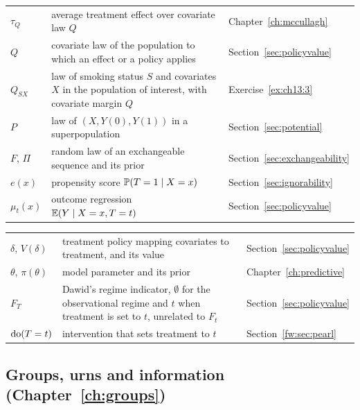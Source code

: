 {\noindent\small\centering
\setlength{\tabcolsep}{4pt}\renewcommand{\arraystretch}{1.1}
\begin{tabular}{>{\raggedright\arraybackslash}p{1.0in}>{\raggedright\arraybackslash}p{2.15in}>{\raggedright\arraybackslash}p{0.95in}}
$\tau_Q$ & average treatment effect over covariate law $Q$ & Chapter~\ref{ch:mccullagh} \\
$Q$ & covariate law of the population to which an effect or a policy applies & Section~\ref{sec:policyvalue} \\
$Q_{SX}$ & law of smoking status $S$ and covariates $X$ in the population of interest, with covariate margin $Q$ & Exercise~\ref{ex:ch13:3} \\
$P$ & law of $(X, Y(0), Y(1))$ in a superpopulation & Section~\ref{sec:potential} \\
$F$, $\Pi$ & random law of an exchangeable sequence and its prior & Section~\ref{sec:exchangeability} \\
$e(x)$ & propensity score $\mathbb{P}(T = 1 \mid X = x)$ & Section~\ref{sec:ignorability} \\
$\mu_t(x)$ & outcome regression $\mathbb{E}(Y \mid X = x, T = t)$ & Section~\ref{sec:policyvalue} \\
\end{tabular}\par}

{\noindent\small\centering
\setlength{\tabcolsep}{4pt}\renewcommand{\arraystretch}{1.1}
\begin{tabular}{>{\raggedright\arraybackslash}p{1.0in}>{\raggedright\arraybackslash}p{2.15in}>{\raggedright\arraybackslash}p{0.95in}}
$\delta$, $V(\delta)$ & treatment policy mapping covariates to treatment, and its value & Section~\ref{sec:policyvalue} \\
$\theta$, $\pi(\theta)$ & model parameter and its prior & Chapter~\ref{ch:predictive} \\
$F_T$ & Dawid's regime indicator, $\emptyset$ for the observational regime and $t$ when treatment is set to $t$, unrelated to $F_t$ & Section~\ref{sec:policyvalue} \\
$\mathrm{do}(T = t)$ & intervention that sets treatment to $t$ & Section~\ref{fw:sec:pearl} \\
\bottomrule
\end{tabular}\par}

\subsection*{Groups, urns and information (Chapter~\ref{ch:groups})}



